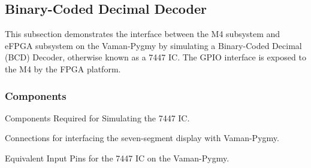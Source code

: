\subsection{Binary-Coded Decimal Decoder}
This subsection demonstrates the interface between the M4 subsystem and eFPGA
subsystem on the Vaman-Pygmy by simulating a Binary-Coded Decimal (BCD) Decoder,
otherwise known as a 7447 IC. The GPIO interface is exposed to the M4 by the
FPGA platform.

\subsubsection{Components}
\begin{table}[!ht]
    \centering
    
    \caption{Components Required for Simulating the 7447 IC.}
    \label{tab:m4-fpga-bcd-components}
\end{table}

\begin{table}[!ht]
    \centering
    
    \caption{Connections for interfacing the seven-segment display with Vaman-Pygmy.}
    \label{tab:m4-fpga-bcd-sevenseg-connections}
\end{table}

\begin{table}[!ht]
    \centering
    
    \caption{Equivalent Input Pins for the 7447 IC on the Vaman-Pygmy.}
    \label{tab:m4-fpga-bcd-bcd-connections}
\end{table}

